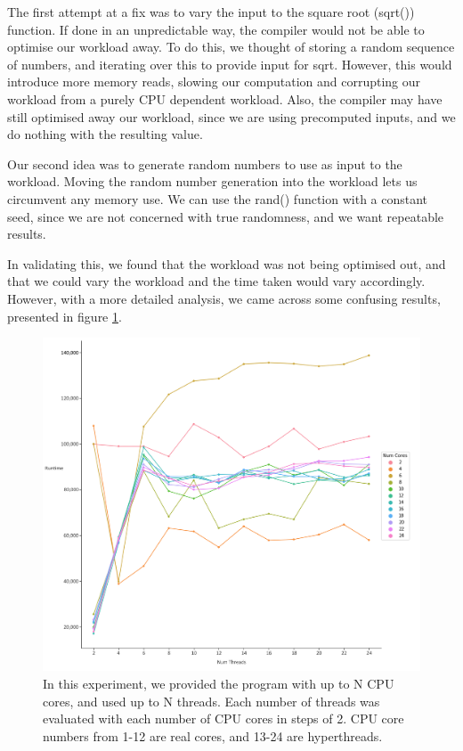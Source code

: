 The first attempt at a fix was to vary the input to the square root (sqrt()) function. If done in an unpredictable way, the compiler would not be able to optimise our workload away. To do this, we thought of storing a random sequence of numbers, and iterating over this to provide input for sqrt. However, this would introduce more memory reads, slowing our computation and corrupting our workload from a purely CPU dependent workload. Also, the compiler may have still optimised away our workload, since we are using precomputed inputs, and we do nothing with the resulting value.

Our second idea was to generate random numbers to use as input to the workload. Moving the random number generation into the workload lets us circumvent any memory use. We can use the rand() function with a constant seed, since we are not concerned with true randomness, and we want repeatable results.

In validating this, we found that the workload was not being optimised out, and that we could vary the workload and the time taken would vary accordingly. However, with a more detailed analysis, we came across some confusing results, presented in figure \ref{fig:optimal_threads_1}.



\begin{figure}[H]
    \includegraphics[width=1\textwidth]{graphics/optimal_threads_1.png}
    \caption{In this experiment, we provided the program with up to N CPU cores, and used up to N threads. Each number of threads was evaluated with each number of CPU cores in steps of 2. CPU core numbers from 1-12 are real cores, and 13-24 are hyperthreads.}
    \label{fig:optimal_threads_1}
\end{figure}



